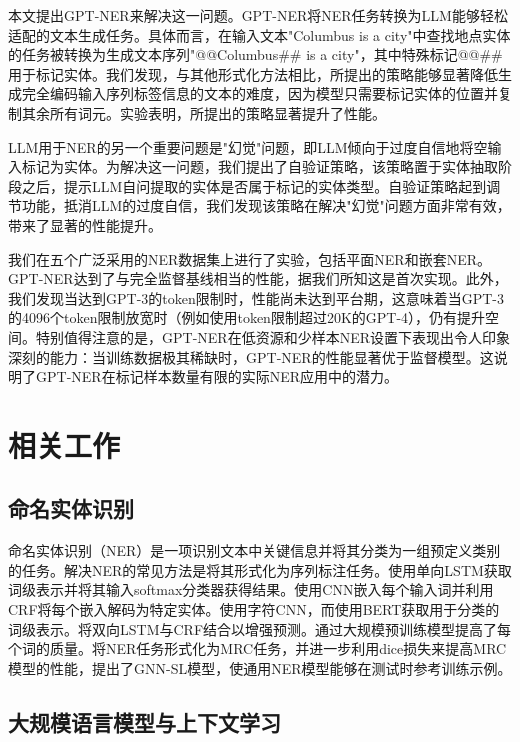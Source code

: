 \documentclass[supercite]{Experimental_Report}
\theoremstyle{definition}
\begin{document}
本文提出GPT-NER来解决这一问题。GPT-NER将NER任务转换为LLM能够轻松适配的文本生成任务。具体而言，在输入文本"Columbus is a city"中查找地点实体的任务被转换为生成文本序列"@@Columbus\#\# is a city"，其中特殊标记@@\#\#用于标记实体。我们发现，与其他形式化方法相比，所提出的策略能够显著降低生成完全编码输入序列标签信息的文本的难度，因为模型只需要标记实体的位置并复制其余所有词元。实验表明，所提出的策略显著提升了性能。

LLM用于NER的另一个重要问题是"幻觉"问题，即LLM倾向于过度自信地将空输入标记为实体。为解决这一问题，我们提出了自验证策略，该策略置于实体抽取阶段之后，提示LLM自问提取的实体是否属于标记的实体类型。自验证策略起到调节功能，抵消LLM的过度自信，我们发现该策略在解决"幻觉"问题方面非常有效，带来了显著的性能提升。

我们在五个广泛采用的NER数据集上进行了实验，包括平面NER和嵌套NER。GPT-NER达到了与完全监督基线相当的性能，据我们所知这是首次实现。此外，我们发现当达到GPT-3的token限制时，性能尚未达到平台期，这意味着当GPT-3的4096个token限制放宽时（例如使用token限制超过20K的GPT-4），仍有提升空间。特别值得注意的是，GPT-NER在低资源和少样本NER设置下表现出令人印象深刻的能力：当训练数据极其稀缺时，GPT-NER的性能显著优于监督模型。这说明了GPT-NER在标记样本数量有限的实际NER应用中的潜力。

\section{相关工作}

\subsection{命名实体识别}

命名实体识别（NER）是一项识别文本中关键信息并将其分类为一组预定义类别的任务。解决NER的常见方法是将其形式化为序列标注任务。\cite{hammerton2003named}使用单向LSTM获取词级表示并将其输入softmax分类器获得结果。\cite{collobert2011natural}使用CNN嵌入每个输入词并利用CRF将每个嵌入解码为特定实体。\cite{chiu2016named}使用字符CNN，而\cite{devlin2018bert}使用BERT获取用于分类的词级表示。\cite{lample2016neural}将双向LSTM与CRF结合以增强预测。\cite{sarzynska2021detecting}通过大规模预训练模型提高了每个词的质量。\cite{li2019unified, li2019dice}将NER任务形式化为MRC任务，并进一步利用dice损失来提高MRC模型的性能，\cite{wang2022gnn}提出了GNN-SL模型，使通用NER模型能够在测试时参考训练示例。

\subsection{大规模语言模型与上下文学习}
\end{document}
